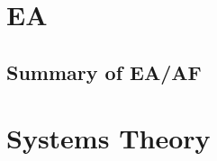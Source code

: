 \section{EA}
\label{sec:sfenterprisearchitecture}



\subsection{Summary of EA/AF}
\label{sub:sfsummaryenterprisearchitecture}

\section{Systems Theory}
\label{sec:sfsystemstheory}


